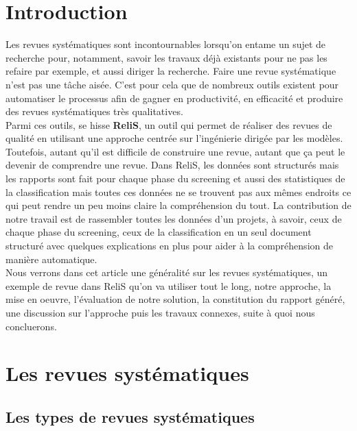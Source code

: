 \section{Introduction}
\vspace*{0.5cm}
\hspace*{1cm} Les revues systématiques sont incontournables lorsqu'on entame un sujet de recherche pour, notamment, savoir les travaux déjà existants pour ne pas les refaire par exemple, et aussi diriger la recherche. Faire une revue systématique n'est pas une tâche aisée. C'est pour cela que de nombreux outils existent pour automatiser le processus afin de gagner en productivité, en efficacité et produire des revues systématiques très qualitatives. \\
Parmi ces outils, se hisse \textbf{ReliS}, un outil qui permet de réaliser des revues de qualité en utilisant une approche centrée sur l'ingénierie dirigée par les modèles.
Toutefois, autant qu'il est difficile de construire une revue, autant que ça peut le devenir de comprendre une revue. Dans ReliS, les données sont structurés mais les rapports sont fait pour chaque phase du screening et aussi des statistiques de la classification mais toutes ces données ne se trouvent pas aux mêmes endroits ce qui peut rendre un peu moins claire la compréhension du tout. La contribution de notre travail est de rassembler toutes les données d'un projets, à savoir, ceux de chaque phase du screening, ceux de la classification en un seul document structuré avec quelques explications en plus pour aider à la compréhension de manière automatique. \\
Nous verrons dans cet article une généralité sur les revues systématiques, un exemple de revue dans ReliS qu'on va utiliser tout le long, notre approche, la mise en oeuvre, l'évaluation de notre solution, la constitution du rapport généré, une discussion sur l'approche puis les travaux connexes, suite à quoi nous concluerons.

\newpage

\section{Les revues systématiques}
\vspace*{4mm} 

\subsection{Les types de revues systématiques}

